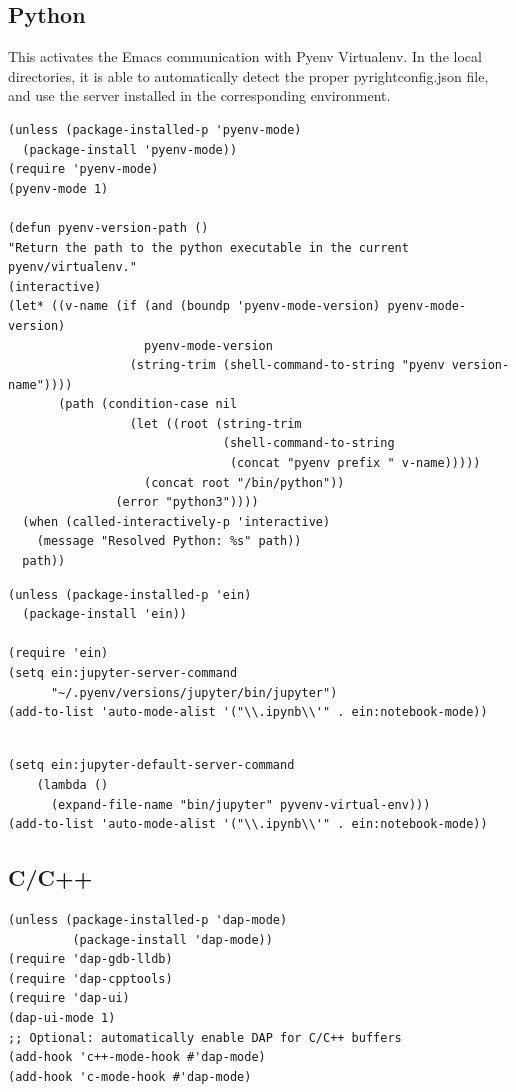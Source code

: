 \documentclass[11pt]{article}
\begin{document}
\subsection{Python}
\label{sec:org8ee049b}
This activates the Emacs communication with Pyenv Virtualenv.
In the local directories, it is able to automatically detect the proper pyrightconfig.json file, and use the server installed in the corresponding environment.
\begin{verbatim}
(unless (package-installed-p 'pyenv-mode)
  (package-install 'pyenv-mode))
(require 'pyenv-mode)
(pyenv-mode 1)

(defun pyenv-version-path ()
"Return the path to the python executable in the current pyenv/virtualenv."
(interactive)
(let* ((v-name (if (and (boundp 'pyenv-mode-version) pyenv-mode-version)
                   pyenv-mode-version
                 (string-trim (shell-command-to-string "pyenv version-name"))))
       (path (condition-case nil
                 (let ((root (string-trim 
                              (shell-command-to-string 
                               (concat "pyenv prefix " v-name)))))
                   (concat root "/bin/python"))
               (error "python3"))))
  (when (called-interactively-p 'interactive)
    (message "Resolved Python: %s" path))
  path))
\end{verbatim}

\begin{verbatim}
(unless (package-installed-p 'ein)
  (package-install 'ein))

(require 'ein)
(setq ein:jupyter-server-command
      "~/.pyenv/versions/jupyter/bin/jupyter")
(add-to-list 'auto-mode-alist '("\\.ipynb\\'" . ein:notebook-mode))
\end{verbatim}
\begin{verbatim}

(setq ein:jupyter-default-server-command
    (lambda ()
      (expand-file-name "bin/jupyter" pyvenv-virtual-env)))
(add-to-list 'auto-mode-alist '("\\.ipynb\\'" . ein:notebook-mode))  
\end{verbatim}
\subsection{C/C++}
\label{sec:org95d8635}
\begin{verbatim}
(unless (package-installed-p 'dap-mode)
         (package-install 'dap-mode))
(require 'dap-gdb-lldb)
(require 'dap-cpptools)
(require 'dap-ui)
(dap-ui-mode 1)
;; Optional: automatically enable DAP for C/C++ buffers
(add-hook 'c++-mode-hook #'dap-mode)
(add-hook 'c-mode-hook #'dap-mode)
\end{verbatim}
\end{document}
